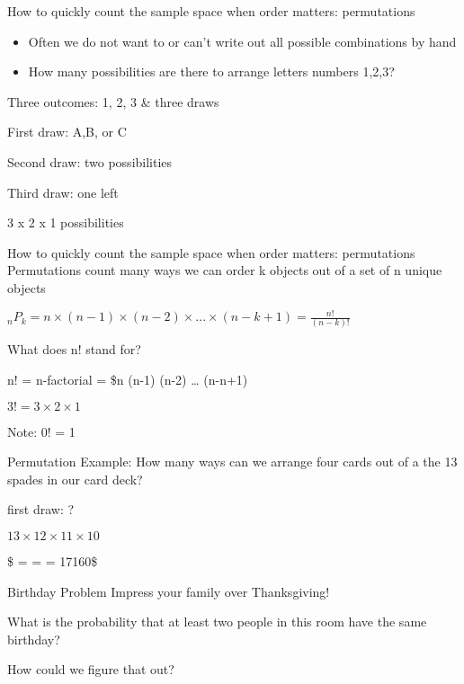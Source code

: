 \documentclass[presentation]{beamer}
\begin{document}
\begin{frame}[label={sec:org904f384}]{How to quickly count the sample space when order matters: permutations}
\begin{itemize}
\item Often we do not want to or can't write out all possible combinations by hand

\item How many possibilities are there to arrange letters numbers 1,2,3?
\end{itemize}

\pause

Three outcomes: 1, 2, 3 \& three draws

\pause
First draw: A,B, or C

Second draw: two possibilities

Third draw: one left

3 x 2 x 1 possibilities
\end{frame}

\begin{frame}[label={sec:orgbec51d1}]{How to quickly count the sample space when order matters: permutations}
Permutations count many ways we can \alert{order} k objects out of a set of n unique objects

\(_{n}P_{k} = n \times (n-1) \times (n-2) \times ... \times (n-k + 1) = \frac{n!}{(n-k)!}\)

What does n! stand for?

\pause

n! = n-factorial = \$n \texttimes{} (n-1) \texttimes{} (n-2) \texttimes{} \ldots{} \texttimes{} (n-n+1)

\(3! = 3 \times 2 \times 1\)

\alert{Note: 0! = 1}
\end{frame}


\begin{frame}[label={sec:orgee25e00}]{Permutation Example:}
How many ways can we arrange four cards out of a the 13 spades in our card deck?

first draw: ?
\pause

\(13 \times 12 \times 11 \times 10\)

\pause

\$  =   =  = 17160\$
\end{frame}

\begin{frame}[label={sec:orga8f5282}]{Birthday Problem}
Impress your family over Thanksgiving!

\pause

What is the probability that at least two people in this room have the same birthday?

How could we figure that out?
\end{frame}
\end{document}
